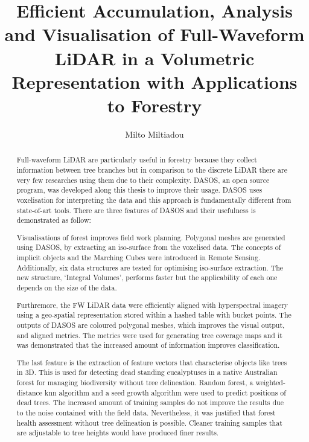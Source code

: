 \documentclass[11pt,nofootinbib]{report}
\title{Efficient Accumulation, Analysis and Visualisation of Full-Waveform LiDAR in a Volumetric Representation with Applications to Forestry}
\author{Milto Miltiadou}
\begin{document}
	\maketitle
 		
\begin{abstract}	
   
     \par Full-waveform LiDAR are particularly useful in forestry because they collect information between tree branches but in comparison to the discrete LiDAR there are very few researches using them due to their complexity. DASOS, an open source program, was developed along this thesis to improve their usage. DASOS uses voxelisation for interpreting the data and this approach is fundamentally different from state-of-art tools. There are three features of DASOS and their usefulness is demonstrated as follow: 
     \par Visualisations of forest improves field work planning. Polygonal meshes are generated using DASOS, by extracting an iso-surface from the voxelised data. The concepts of implicit objects and the Marching Cubes were introduced in Remote Sensing. Additionally, six data structures are tested for optimising iso-surface extraction. The new structure, `Integral Volumes', performs faster but the applicability of each one depends on the size of the data.
     \par Furthremore, the FW LiDAR data were efficiently aligned with hyperspectral imagery using a geo-spatial representation stored within a hashed table with bucket points. The outputs of DASOS are coloured polygonal meshes, which improves the visual output, and aligned metrics. The metrics were used for generating tree coverage maps and it was demonstrated that the increased amount of information improves classification. 
     \par The last feature is the extraction of feature vectors that characterise objects like trees in 3D. This is used for detecting dead standing eucalyptuses in a native Australian forest for managing biodiversity without tree delineation.  Random forest, a weighted-distance knn algorithm and a seed growth algorithm were used to predict positions of dead trees. The increased amount of training samples do not improve the results due to the noise contained with the field data. Nevertheless, it was justified that forest health assessment without tree delineation is possible. Cleaner training samples that are adjustable to tree heights would have produced finer results.  
     
    
     \thispagestyle{empty}
\end{abstract}
\end{document}
